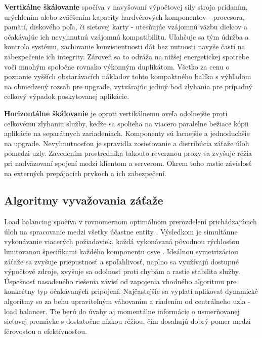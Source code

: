 \documentclass[12pt, a4paper]{article}
\begin{document}
\textbf{Vertikálne škálovanie} spočíva v navyšovaní výpočtovej sily stroja pridaním, urýchlením 
alebo zväčšením kapacity hardvérových komponentov - procesora, pamätí, diskového poľa, či sieťovej karty - 
utesňujúc vzájomnú väzbu dielcov a očakávajúc ich nevyhnutnú vzájomnú kompatibilitu. Uľahčuje sa tým
údržba a kontrola systému, zachovanie konzistentnosti dát bez nutnosti navyše častí na
zabezpečenie ich integrity. Zároveň sa to odráža na nižšej energetickej spotrebe voči 
mnohým spoločne rovnako výkonným duplikátom. Všetko za cenu o poznanie vyšších obstarávacích nákladov tohto 
kompaktného balíka s výhľadom na obmedzený rozsah pre upgrade, vytvárajúc jediný bod zlyhania pre prípadný 
celkový výpadok poskytovanej aplikácie.

\textbf{Horizontálne škálovanie} je oproti vertikálnemu oveľa odolnejšie proti celkovému zlyhaniu služby, 
keďže sa spolieha na viacero paralelne bežiace kópii aplikácie na separátnych zariadeniach. Komponenty sú 
lacnejšie a jednoduchšie na upgrade. Nevyhnutnosťou je spravidla zosieťovanie a distribúcia záťaže úloh 
pomedzi uzly. Zavedením prostredníka takouto reverznou proxy sa zvyšuje réžia pri nadväzovaní spojení 
medzi klientom a serverom. Okrem toho rastie závislosť na externých prepájacích prvkoch a ich zabezpečení.

\subsection{Algoritmy vyvažovania záťaže}
Load balancing spočíva v rovnomernom optimálnom prerozdelení prichádzajúcich úloh 
na spracovanie medzi všetky účastne entity \cite{load-balance-in-distributed-system}. 
Výsledkom je simultánne vykonávanie viacerých požiadaviek, každá vykonávaná pôvodnou rýchlosťou limitovanou
špecifikami každého komponentu osve \cite{haproxy-docs}. Ideálnou symetrizáciou záťaže sa zvyšuje 
priepustnosť a spoľahlivosť, naplno sa využívajú dostupné výpočtové zdroje, zvyšuje sa odolnosť proti chybám 
a rastie stabilita služby. Úspešnosť nasadeného riešenia závisí od zapojenia vhodného algoritmu pre 
konkrétny typ očakávaných pripojení. Najčastejšie sa vyplatí aplikovať dynamické algoritmy so za behu 
upraviteľným váhovaním a riadením od centrálneho uzla - load balancer. Tie berú do úvahy aj momentálne 
informácie o usmerňovanej sieťovej premávke s dostatočne nízkou réžiou, čím dosahujú dobrý pomer medzi 
férovosťou a efektívnosťou.
\end{document}
